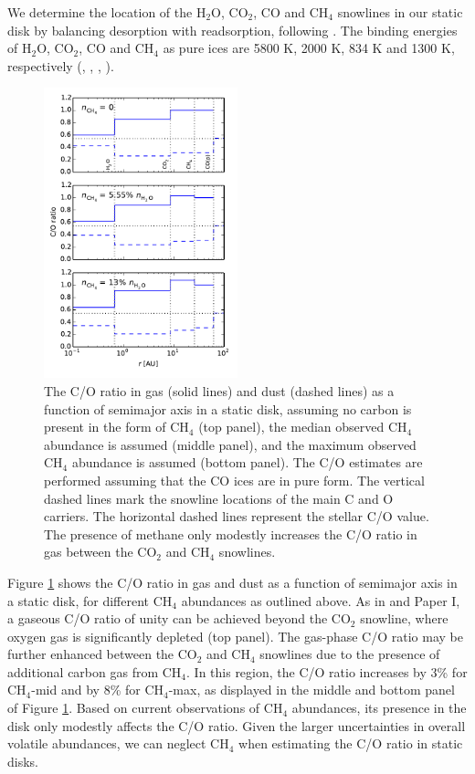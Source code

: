 \documentclass[apj]{emulateapj}
\begin{document}
We determine the location of the H$_2$O, CO$_2$, CO and CH$_4$ snowlines in our static disk by balancing desorption with readsorption, following \citet{hollenbach09}. The binding energies of H$_2$O, CO$_2$, CO and CH$_4$ as pure ices are 5800 K, 2000 K, 834 K and 1300 K, respectively (\citealt{fraser01}, \citealt{collings04}, \citealt{fayolle16}, \citealt{garrod06}).

\begin{figure}[h!]
\centering
\includegraphics[width=0.5\textwidth]{../../figs/C_O_ratio_CH4.pdf}
\caption{The C/O ratio in gas (solid lines) and dust (dashed lines) as a function of semimajor axis in a static disk, assuming no carbon is present in the form of CH$_4$ (top panel), the median observed CH$_4$ abundance is assumed (middle panel), and the maximum observed CH$_4$ abundance is assumed (bottom panel). The C/O estimates are performed assuming that the CO ices are in pure form. The vertical dashed lines mark the snowline locations of the main C and O carriers. The horizontal dashed lines represent the stellar C/O value. The presence of methane only modestly increases the C/O ratio in gas between the CO$_2$ and CH$_4$ snowlines.} 
\label{fig:COstatic}
\end{figure}

Figure \ref{fig:COstatic} shows the C/O ratio in gas and dust as a function of semimajor axis in a static disk, for different CH$_4$ abundances as outlined above. As in \citet{oberg11} and Paper I, a gaseous C/O ratio of unity can be achieved beyond the CO$_2$ snowline, where oxygen gas is significantly depleted (top panel). The gas-phase C/O ratio may be further enhanced between the CO$_2$ and CH$_4$ snowlines due to the presence of additional carbon gas from CH$_4$. In this region, the C/O ratio increases by 3\% for CH$_4$-mid and by 8\% for  CH$_4$-max, as displayed in the middle and bottom panel of Figure \ref{fig:COstatic}. Based on current observations of CH$_4$ abundances, its presence in the disk only modestly affects the C/O ratio. Given the larger uncertainties in overall volatile abundances, we can neglect CH$_4$ when estimating the C/O ratio in static disks. %
\end{document}
